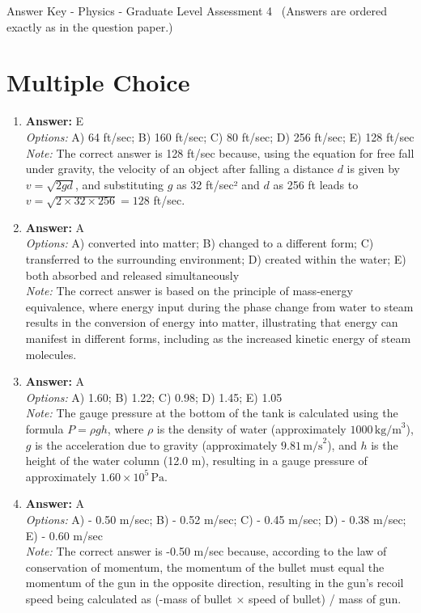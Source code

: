 \documentclass[12pt]{article}
\begin{document}
\begin{center}
Answer Key - Physics - Graduate Level Assessment 4 \
\small (Answers are ordered exactly as in the question paper.)
\end{center}

\section*{Multiple Choice}
\begin{enumerate}[label=\arabic*.]
\item \textbf{Answer:} E
\\ \textit{Options:} A) 64 ft/sec; B) 160 ft/sec; C) 80 ft/sec; D) 256 ft/sec; E) 128 ft/sec
\\ \textit{Note:} The correct answer is 128 ft/sec because, using the equation for free fall under gravity, the velocity of an object after falling a distance \( d \) is given by \( v = \sqrt{2 gd} \), and substituting \( g \) as 32 ft/sec² and \( d \) as 256 ft leads to \( v = \sqrt{2 \times 32 \times 256} = 128 \) ft/sec.
\item \textbf{Answer:} A
\\ \textit{Options:} A) converted into matter; B) changed to a different form; C) transferred to the surrounding environment; D) created within the water; E) both absorbed and released simultaneously
\\ \textit{Note:} The correct answer is based on the principle of mass-energy equivalence, where energy input during the phase change from water to steam results in the conversion of energy into matter, illustrating that energy can manifest in different forms, including as the increased kinetic energy of steam molecules.
\item \textbf{Answer:} A
\\ \textit{Options:} A) 1.60; B) 1.22; C) 0.98; D) 1.45; E) 1.05
\\ \textit{Note:} The gauge pressure at the bottom of the tank is calculated using the formula \( P = \rho g h \), where \(\rho\) is the density of water (approximately \(1000 \, \text{kg/m}^3\)), \(g\) is the acceleration due to gravity (approximately \(9.81 \, \text{m/s}^2\)), and \(h\) is the height of the water column (12.0 m), resulting in a gauge pressure of approximately \(1.60 \times 10^5 \, \text{Pa}\).
\item \textbf{Answer:} A
\\ \textit{Options:} A) - 0.50 m/sec; B) - 0.52 m/sec; C) - 0.45 m/sec; D) - 0.38 m/sec; E) - 0.60 m/sec
\\ \textit{Note:} The correct answer is -0.50 m/sec because, according to the law of conservation of momentum, the momentum of the bullet must equal the momentum of the gun in the opposite direction, resulting in the gun's recoil speed being calculated as (-mass of bullet × speed of bullet) / mass of gun.

\end{enumerate}
\end{document}
